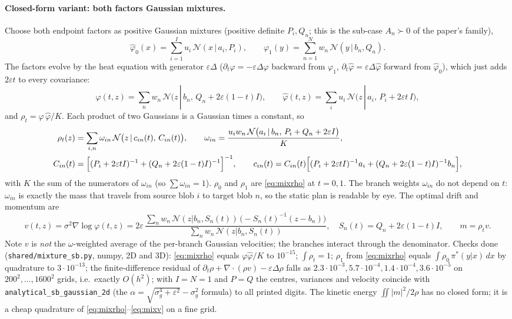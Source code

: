 \documentclass[11pt]{article}
\newcommand{\eps}{\varepsilon}
\newcommand{\code}[1]{\texttt{#1}}
\newcommand{\dv}{\nabla\cdot}
\begin{document}
\paragraph{Closed-form variant: both factors Gaussian mixtures.}
Choose both endpoint factors as positive Gaussian mixtures (positive definite
$P_i,Q_n$; this is the sub-case $A_n\succ0$ of the paper's family),
\[
  \hat\varphi_0(x)=\sum_{i=1}^{I}u_i\,\mathcal N(x\,|\,a_i,P_i),\qquad
  \varphi_1(y)=\sum_{n=1}^{N}w_n\,\mathcal N(y\,|\,b_n,Q_n).
\]
The factors evolve by the heat equation with generator $\eps\Delta$
($\partial_t\varphi=-\eps\Delta\varphi$ backward from $\varphi_1$,
$\partial_t\hat\varphi=\eps\Delta\hat\varphi$ forward from $\hat\varphi_0$), which
just adds $2\eps t$ to every covariance:
\[
  \varphi(t,z)=\sum_n w_n\,\mathcal N\bigl(z\,|\,b_n,\,Q_n+2\eps(1-t)I\bigr),\qquad
  \hat\varphi(t,z)=\sum_i u_i\,\mathcal N\bigl(z\,|\,a_i,\,P_i+2\eps t\,I\bigr),
\]
and $\rho_t=\varphi\,\hat\varphi/K$. Each product of two Gaussians is a Gaussian
times a constant, so
\begin{align}
  \rho_t(z)&=\sum_{i,n}\omega_{in}\,\mathcal N\bigl(z\,|\,c_{in}(t),\,C_{in}(t)\bigr),
  \qquad
  \omega_{in}=\frac{u_iw_n\,\mathcal N\bigl(a_i\,|\,b_n,\,P_i+Q_n+2\eps I\bigr)}{K},
  \label{eq:mixrho}\\
  C_{in}(t)&=\Bigl[(P_i+2\eps tI)^{-1}+(Q_n+2\eps(1-t)I)^{-1}\Bigr]^{-1},\qquad
  c_{in}(t)=C_{in}(t)\Bigl[(P_i+2\eps tI)^{-1}a_i+(Q_n+2\eps(1-t)I)^{-1}b_n\Bigr],
  \nonumber
\end{align}
with $K$ the sum of the numerators of $\omega_{in}$ (so $\sum\omega_{in}=1$).
$\rho_0$ and $\rho_1$ are \eqref{eq:mixrho} at $t=0,1$. The branch weights
$\omega_{in}$ do not depend on $t$: $\omega_{in}$ is exactly the mass that travels
from source blob $i$ to target blob $n$, so the static plan is readable by eye.
The optimal drift and momentum are
\begin{equation}
  v(t,z)=\sigma^2\nabla\log\varphi(t,z)
  =2\eps\,\frac{\sum_n w_n\,\mathcal N(z|b_n,S_n(t))\,\bigl(-S_n(t)^{-1}(z-b_n)\bigr)}
                 {\sum_n w_n\,\mathcal N(z|b_n,S_n(t))},\quad S_n(t)=Q_n+2\eps(1-t)I,
  \qquad m=\rho_t v.
  \label{eq:mixv}
\end{equation}
Note $v$ is \emph{not} the $\omega$-weighted average of the per-branch Gaussian
velocities; the branches interact through the denominator. Checks done
(\code{shared/mixture\_sb.py}, numpy, 2D and 3D): \eqref{eq:mixrho} equals
$\varphi\hat\varphi/K$ to $10^{-15}$; $\int\rho_t=1$; $\rho_1$ from
\eqref{eq:mixrho} equals $\int\rho_0\,\pi^\ast(y|x)\,dx$ by quadrature to
$3\cdot10^{-13}$; the finite-difference residual of
$\partial_t\rho+\dv(\rho v)-\eps\Delta\rho$ falls as $2.3\cdot10^{-3},5.7\cdot10^{-4},
1.4\cdot10^{-4},3.6\cdot10^{-5}$ on $200^2,\dots,1600^2$ grids, i.e.\ exactly
$O(h^2)$; with $I=N=1$ and $P=Q$ the centres, variances and velocity coincide with
\code{analytical\_sb\_gaussian\_2d} (the $\alpha=\sqrt{\sigma_g^4+\eps^2}-\sigma_g^2$
formula) to all printed digits.
The kinetic energy $\iint|m|^2/2\rho$ has no closed form; it is a cheap
quadrature of \eqref{eq:mixrho}--\eqref{eq:mixv} on a fine grid.
\end{document}
